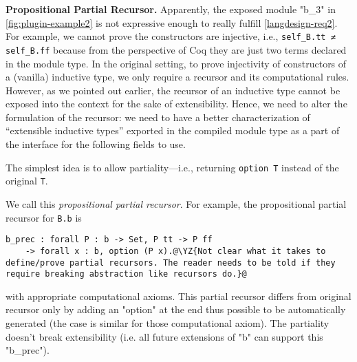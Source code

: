 \textbf{Propositional Partial Recursor.}
Apparently, the exposed module "b_3" in \cref{fig:plugin-example2} is
not expressive enough to really fulfill \ref{langdesign-req2}. For
example, we cannot prove the constructors are injective, i.e.,
\texttt{self_B.tt ≠ self_B.ff} because from the perspective of Coq they are just two terms declared in the module type.
In the original setting, to
prove injectivity of constructors of a (vanilla) inductive type, we only
require a recursor and its computational rules. However, as we pointed
out earlier, the recursor of an inductive type cannot be exposed into
the context for the sake of extensibility. Hence, we need to alter the
formulation of the recursor: we need to have a better
characterization of ``extensible inductive types'' exported in the
compiled module type as a part of the interface for the following fields
to use.


The simplest idea is to allow partiality---i.e., returning
\texttt{option T} instead of the original \texttt{T}.

We call this \textit{propositional partial recursor}.
For example, the propositional partial recursor for \texttt{B.b} is

\begin{verbatim}
b_prec : forall P : b -> Set, P tt -> P ff
    -> forall x : b, option (P x).@\YZ{Not clear what it takes to define/prove partial recursors. The reader needs to be told if they require breaking abstraction like recursors do.}@
\end{verbatim}
with appropriate computational axioms. This partial recursor differs from original recursor only by adding an "option" at the end thus possible to be automatically generated (the case is similar for those computational axiom). The partiality doesn't break
extensibility (i.e. all future extensions of "b" can support this
"b_prec"). 

